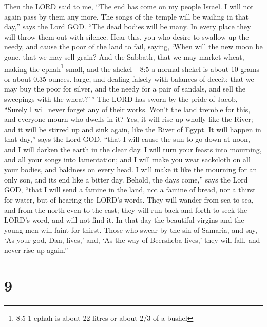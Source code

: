 Then the LORD said to me, ``The end has come on my people Israel. I will
not again pass by them any more.  The songs of the temple
will be wailing in that day,'' says the Lord GOD. ``The dead bodies will
be many. In every place they will throw them out with silence.
 Hear this, you who desire to swallow up the needy, and
cause the poor of the land to fail,  saying, `When will the
new moon be gone, that we may sell grain? And the Sabbath, that we may
market wheat, making the ephah\footnote{8:5 1 ephah is about 22 litres
  or about 2/3 of a bushel} small, and the shekel+ 8:5 a normal shekel
is about 10 grams or about 0.35 ounces. large, and dealing falsely with
balances of deceit;  that we may buy the poor for silver,
and the needy for a pair of sandals, and sell the sweepings with the
wheat?'\,''  The LORD has sworn by the pride of Jacob,
``Surely I will never forget any of their works.  Won't the
land tremble for this, and everyone mourn who dwells in it? Yes, it will
rise up wholly like the River; and it will be stirred up and sink again,
like the River of Egypt.  It will happen in that day,'' says
the Lord GOD, ``that I will cause the sun to go down at noon, and I will
darken the earth in the clear day.  I will turn your feasts
into mourning, and all your songs into lamentation; and I will make you
wear sackcloth on all your bodies, and baldness on every head. I will
make it like the mourning for an only son, and its end like a bitter
day.  Behold, the days come,'' says the Lord GOD, ``that I
will send a famine in the land, not a famine of bread, nor a thirst for
water, but of hearing the LORD's words.  They will wander
from sea to sea, and from the north even to the east; they will run back
and forth to seek the LORD's word, and will not find it. 
In that day the beautiful virgins and the young men will faint for
thirst.  Those who swear by the sin of Samaria, and say,
`As your god, Dan, lives,' and, `As the way of Beersheba lives,' they
will fall, and never rise up again.''

\hypertarget{section-8}{%
\section{9}\label{section-8}}

